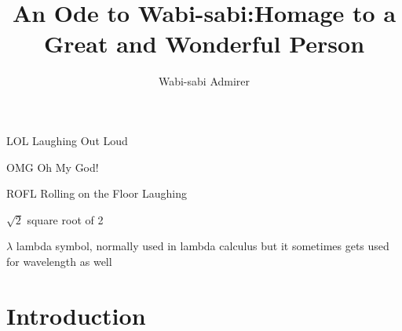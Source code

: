 \documentclass[dissertation]{bsu-cs}  %
\title{An Ode to Wabi-sabi:\titleBreak Homage to a Great and Wonderful Person}
\author{Wabi-sabi Admirer}
\begin{document}
\frontmatter  %

\buildFrontPages %

\begin{listAbbreviations}
  \item[LOL] Laughing Out Loud
  \item[OMG] Oh My God! 
  \item[ROFL] Rolling on the Floor Laughing
\end{listAbbreviations}


\begin{listSymbols}
  \item[$\sqrt{2}$] square root of 2
  \item[$\lambda$] lambda symbol, normally used in lambda calculus but
    it sometimes gets used for wavelength as well
\end{listSymbols}



\mainmatter


%
%

\chapter{Introduction}

%
%
\end{document}
